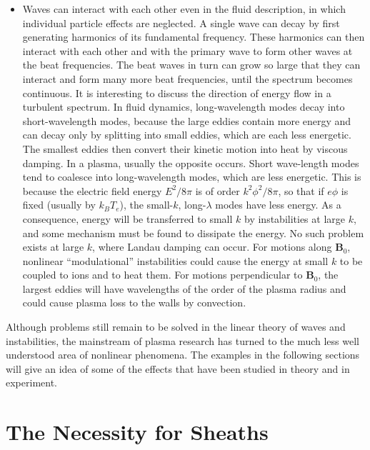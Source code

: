 \documentclass[
  notoc %
]{tufte-book}
\providecommand{\tightlist}{%
  \setlength{\itemsep}{0pt}\setlength{\parskip}{0pt}
}
\begin{document}
\begin{itemize}
\tightlist
\item
  Waves can interact with each other even in the fluid description, in
  which individual particle effects are neglected. A single wave can
  decay by first generating harmonics of its fundamental frequency.
  These harmonics can then interact with each other and with the primary
  wave to form other waves at the beat frequencies. The beat waves in
  turn can grow so large that they can interact and form many more beat
  frequencies, until the spectrum becomes continuous. It is interesting
  to discuss the direction of energy flow in a turbulent spectrum. In
  fluid dynamics, long-wavelength modes decay into short-wavelength
  modes, because the large eddies contain more energy and can decay only
  by splitting into small eddies, which are each less energetic. The
  smallest eddies then convert their kinetic motion into heat by viscous
  damping. In a plasma, usually the opposite occurs. Short wave-length
  modes tend to coalesce into long-wavelength modes, which are less
  energetic. This is because the electric field energy \(E^2/8\pi\) is
  of order \(k^2\phi^2/8\pi\), so that if \(e\phi\) is fixed (usually by
  \(k_B T_e\)), the small-\(k\), long-\(\lambda\) modes have less
  energy. As a consequence, energy will be transferred to small \(k\) by
  instabilities at large \(k\), and some mechanism must be found to
  dissipate the energy. No such problem exists at large \(k\), where
  Landau damping can occur. For motions along \(\mathbf{B}_0\),
  nonlinear ``modulational'' instabilities could cause the energy at
  small \(k\) to be coupled to ions and to heat them. For motions
  perpendicular to \(\mathbf{B}_0\), the largest eddies will have
  wavelengths of the order of the plasma radius and could cause plasma
  loss to the walls by convection.
\end{itemize}

Although problems still remain to be solved in the linear theory of
waves and instabilities, the mainstream of plasma research has turned to
the much less well understood area of nonlinear phenomena. The examples
in the following sections will give an idea of some of the effects that
have been studied in theory and in experiment.

\hypertarget{sec:sheath}{%
\section{The Necessity for Sheaths}\label{sec:sheath}}
\end{document}
